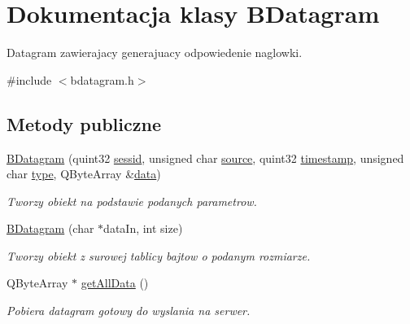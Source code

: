 \hypertarget{class_b_datagram}{
\section{Dokumentacja klasy BDatagram}
\label{class_b_datagram}
}


Datagram zawierajacy generajuacy odpowiedenie naglowki.  


{\ttfamily \#include $<$bdatagram.h$>$}\subsection*{Metody publiczne}
\begin{DoxyCompactItemize}
\item 
\hyperlink{class_b_datagram_a6a687551e97a36b91c6a40a1c5a374ed}{BDatagram} (quint32 \hyperlink{class_b_datagram_ad77fa0aefd216480abe999e24f28dba6}{sessid}, unsigned char \hyperlink{class_b_datagram_a2e70a774059cddc0a5715850370bc1d9}{source}, quint32 \hyperlink{class_b_datagram_a1a0d1b7430e0e9d95cd9248b3499904f}{timestamp}, unsigned char \hyperlink{class_b_datagram_a3ae0b66921f9b51864beb65e5e03eeb9}{type}, QByteArray \&\hyperlink{class_b_datagram_a98d72aa468643e0179bbc02d6dbf388e}{data})
\begin{DoxyCompactList}\small\item\em Tworzy obiekt na podstawie podanych parametrow. \item\end{DoxyCompactList}\item 
\hypertarget{class_b_datagram_a63ed2c2ac245dec6a1179a3ac7ace1b6}{
\hyperlink{class_b_datagram_a63ed2c2ac245dec6a1179a3ac7ace1b6}{BDatagram} (char $\ast$dataIn, int size)}
\label{class_b_datagram_a63ed2c2ac245dec6a1179a3ac7ace1b6}

\begin{DoxyCompactList}\small\item\em Tworzy obiekt z surowej tablicy bajtow o podanym rozmiarze. \item\end{DoxyCompactList}\item 
\hypertarget{class_b_datagram_abf97808c5ae33d46feb4e2f1a920cb4f}{
QByteArray $\ast$ \hyperlink{class_b_datagram_abf97808c5ae33d46feb4e2f1a920cb4f}{getAllData} ()}
\label{class_b_datagram_abf97808c5ae33d46feb4e2f1a920cb4f}

\begin{DoxyCompactList}\small\item\em Pobiera datagram gotowy do wyslania na serwer. \item\end{DoxyCompactList}\end{DoxyCompactItemize}
